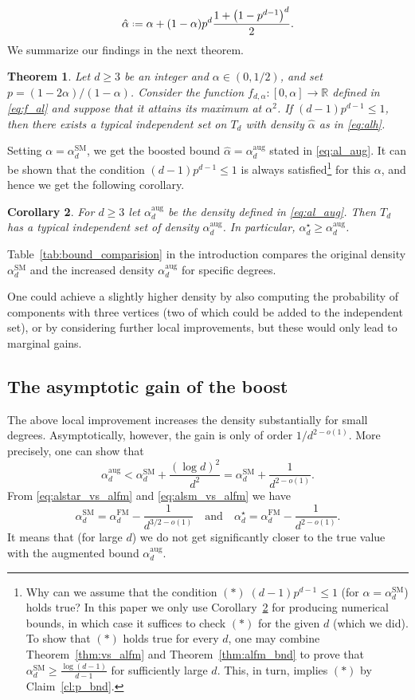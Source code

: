 \documentclass[12pt]{amsart}
\newtheorem{theorem}{Theorem}[section]
\newtheorem{corollary}[theorem]{Corollary}
\theoremstyle{definition}
\newcommand\Rb{\mathbb{R}}
\newcommand\al{\alpha}
\newcommand\alh{\hat{\alpha}}
\newcommand\alstar{\alpha^{\star}}
\newcommand\alfm{\alpha^{\mathrm{FM}}}
\newcommand\alsm{\alpha^{\mathrm{SM}}}
\newcommand\alaug{\alpha^{\mathrm{aug}}}
\newcommand{\defeq}{\mathrel{\vcenter{\baselineskip0.5ex \lineskiplimit0pt
                     \hbox{\scriptsize.}\hbox{\scriptsize.}}}%
                     =}
\begin{document}
%
\begin{equation} \label{eq:alh}
\alh \defeq \al + 
(1-\al)p^d\frac{1+\big( 1- p^{d-1} \big)^d}{2} .
\end{equation}
%
We summarize our findings in the next theorem.
%
\begin{theorem} \label{thm:augmented_indep}
Let $d \geq 3$ be an integer and $\al \in (0,1/2)$, and set $p=(1-2\al)/(1-\al)$. Consider the function $f_{d,\al} \colon [0,\al] \to \Rb$ defined in \eqref{eq:f_al} and suppose that it attains its maximum at $\al^2$. If $(d-1)p^{d-1} \leq 1$, then there exists a typical independent set on $T_d$ with density $\alh$ as in \eqref{eq:alh}.
\end{theorem}
%
Setting $\al=\alsm_d$, we get the boosted bound $\alh=\alaug_d$ stated in \eqref{eq:al_aug}. It can be shown that the condition $(d-1)p^{d-1} \leq 1$ is always satisfied\footnote{Why can we assume that the condition $(\ast)\; (d-1)p^{d-1} \leq 1$ (for $\al=\alsm_d$) holds true? In this paper we only use Corollary~\ref{cor:alaug} for producing numerical bounds, in which case it suffices to check $(\ast)$ for the given $d$ (which we did). To show that $(\ast)$ holds true for every $d$, one may combine Theorem~\ref{thm:vs_alfm} and Theorem~\ref{thm:alfm_bnd} to prove that $\alsm_d \geq \frac{\log(d-1)}{d-1}$ for sufficiently large $d$. This, in turn, implies $(\ast)$ by Claim~\ref{cl:p_bnd}.} for this $\al$, and hence we get the following corollary. 
%
\begin{corollary} \label{cor:alaug}
For $d \geq 3$ let $\alaug_d$ be the density defined in \eqref{eq:al_aug}. Then $T_d$ has a typical independent set of density $\alaug_d$. In particular, $\alstar_d \geq \alaug_d$.
\end{corollary}
%
Table~\ref{tab:bound_comparision} in the introduction compares the original density $\alsm_d$ and the increased density $\alaug_d$ for specific degrees.

One could achieve a slightly higher density by also computing the probability of components with three vertices (two of which could be added to the independent set), or by considering further local improvements, but these would only lead to marginal gains.

\subsection{The asymptotic gain of the boost} \label{sec:asymptotic_gain}
%
The above local improvement increases the density substantially for small degrees. Asymptotically, however, the gain is only of order $1/d^{2-o(1)}$. More precisely, one can show that 
%
\begin{equation} \label{eq:gain}
\alaug_d < \alsm_d + \frac{(\log d)^2}{d^2} 
= \alsm_d + \frac{1}{d^{2-o(1)}} .
\end{equation}
%
From \eqref{eq:alstar_vs_alfm} and \eqref{eq:alsm_vs_alfm} we have 
%
\[ \alsm_d = \alfm_d - \frac{1}{d^{3/2-o(1)}} 
\quad \text{and} \quad 
\alstar_d = \alfm_d - \frac{1}{d^{2-o(1)}} .\]
%
It means that (for large $d$) we do not get significantly closer to the true value with the augmented bound $\alaug_d$.
\end{document}
